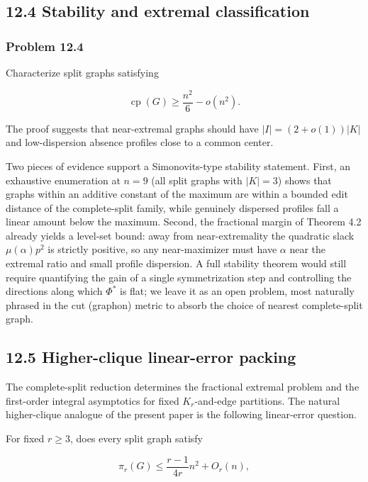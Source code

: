 \documentclass[
  11pt,
]{article}
\begin{document}
\subsection{12.4 Stability and extremal
classification}\label{stability-and-extremal-classification}

\subsubsection{Problem 12.4}\label{problem-12.4}

Characterize split graphs satisfying

\[
\operatorname{cp}(G)
\ge
\frac{n^2}{6}-o(n^2).
\]

The proof suggests that near-extremal graphs should have
\(|I|=(2+o(1))|K|\) and low-dispersion absence profiles close to a
common center.

Two pieces of evidence support a Simonovits-type stability statement.
First, an exhaustive enumeration at \(n=9\) (all split graphs with
\(|K|=3\)) shows that graphs within an additive constant of the maximum
are within a bounded edit distance of the complete-split family, while
genuinely dispersed profiles fall a linear amount below the maximum.
Second, the fractional margin of Theorem 4.2 already yields a level-set
bound: away from near-extremality the quadratic slack \(\mu(\alpha)p^2\)
is strictly positive, so any near-maximizer must have \(\alpha\) near
the extremal ratio and small profile dispersion. A full stability
theorem would still require quantifying the gain of a single
symmetrization step and controlling the directions along which
\(\Phi^*\) is flat; we leave it as an open problem, most naturally
phrased in the cut (graphon) metric to absorb the choice of nearest
complete-split graph.

\subsection{12.5 Higher-clique linear-error
packing}\label{higher-clique-linear-error-packing}

The complete-split reduction determines the fractional extremal problem
and the first-order integral asymptotics for fixed \(K_r\)-and-edge
partitions. The natural higher-clique analogue of the present paper is
the following linear-error question.

For fixed \(r\ge3\), does every split graph satisfy

\[
\pi_r(G)
\le
\frac{r-1}{4r}n^2+O_r(n),
\]
\end{document}
